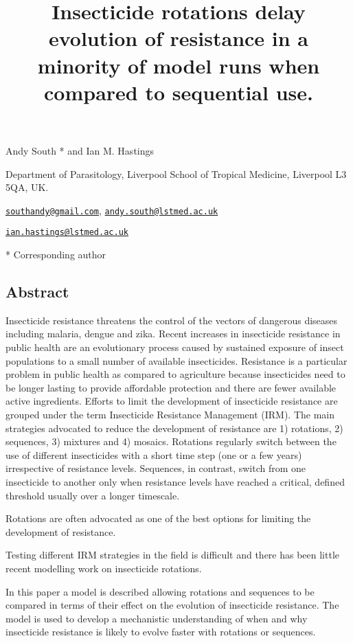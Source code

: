 \documentclass[11pt,]{article}
\title{Insecticide rotations delay evolution of resistance in a minority of
model runs when compared to sequential use.}
\author{}
\date{}
\begin{document}
\maketitle

Andy South * and Ian M. Hastings

Department of Parasitology, Liverpool School of Tropical Medicine,
Liverpool L3 5QA, UK.

\href{mailto:southandy@gmail.com}{\nolinkurl{southandy@gmail.com}},
\href{mailto:andy.south@lstmed.ac.uk}{\nolinkurl{andy.south@lstmed.ac.uk}}

\href{mailto:ian.hastings@lstmed.ac.uk}{\nolinkurl{ian.hastings@lstmed.ac.uk}}

* Corresponding author

\subsection{Abstract}\label{abstract}

Insecticide resistance threatens the control of the vectors of dangerous
diseases including malaria, dengue and zika. Recent increases in
insecticide resistance in public health are an evolutionary process
caused by sustained exposure of insect populations to a small number of
available insecticides. Resistance is a particular problem in public
health as compared to agriculture because insecticides need to be longer
lasting to provide affordable protection and there are fewer available
active ingredients. Efforts to limit the development of insecticide
resistance are grouped under the term Insecticide Resistance Management
(IRM). The main strategies advocated to reduce the development of
resistance are 1) rotations, 2) sequences, 3) mixtures and 4) mosaics.
Rotations regularly switch between the use of different insecticides
with a short time step (one or a few years) irrespective of resistance
levels. Sequences, in contrast, switch from one insecticide to another
only when resistance levels have reached a critical, defined threshold
usually over a longer timescale.

Rotations are often advocated as one of the best options for limiting
the development of resistance.

Testing different IRM strategies in the field is difficult and there has
been little recent modelling work on insecticide rotations.

In this paper a model is described allowing rotations and sequences to
be compared in terms of their effect on the evolution of insecticide
resistance. The model is used to develop a mechanistic understanding of
when and why insecticide resistance is likely to evolve faster with
rotations or sequences.
\end{document}
